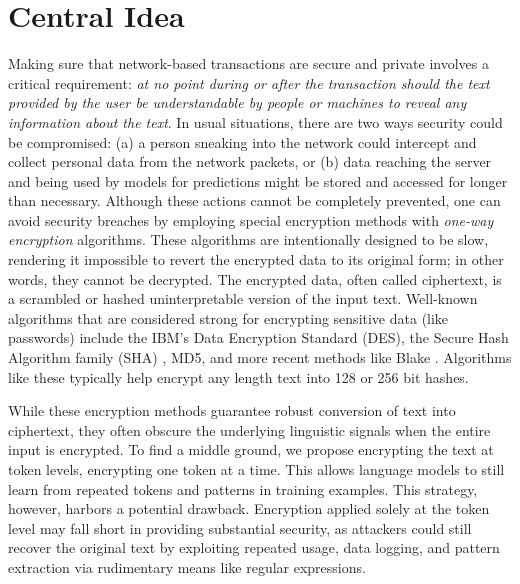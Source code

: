 \documentclass[letterpaper]{article} %
\begin{document}
\section{Central Idea}
\label{ref:central_idea}
Making sure that network-based transactions are secure and private involves a critical requirement: \emph{at no point during or after the transaction should the text provided by the user be understandable by people or machines to reveal any information about the text}. In usual situations, there are two ways security could be compromised: (a) a person sneaking into the network could intercept and collect personal data from the network packets, or (b) data reaching the server and being used by models for predictions might be stored and accessed for longer than necessary. Although these actions cannot be completely prevented, one can avoid security breaches by employing special encryption methods with \emph{one-way encryption} algorithms. These algorithms are intentionally designed to be slow, rendering it impossible to revert the encrypted data to its original form; in other words, they cannot be decrypted. The encrypted data, often called ciphertext, is a scrambled or hashed uninterpretable version of the input text. Well-known algorithms that are considered strong for encrypting sensitive data (like passwords) include the IBM's Data Encryption Standard (DES), the Secure Hash Algorithm family (SHA) \cite{penard2008secure}, MD5, and more recent methods like Blake \cite{blake2}. Algorithms like these typically help encrypt any length text into 128 or 256 bit hashes. 

While these encryption methods guarantee robust conversion of text into ciphertext, they often obscure the underlying linguistic signals when the entire input is encrypted. To find a middle ground, we propose encrypting the text at token levels, encrypting one token at a time. This allows language models to still learn from repeated tokens and patterns in training examples. This strategy, however, harbors a potential drawback. Encryption applied solely at the token level may fall short in providing substantial security, as attackers could still recover the original text by exploiting repeated usage, data logging, and pattern extraction via rudimentary means like regular expressions.
\end{document}
